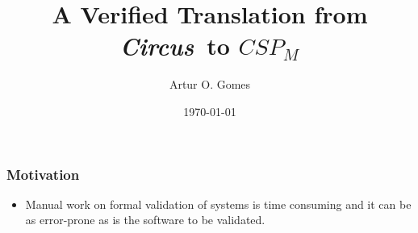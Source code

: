 \documentclass{beamer}
\newcommand{\CSPM}{$CSP_M$}
\def\Circus{{\sf\slshape{Circus}}}
\begin{document}
\title{A Verified Translation from \Circus\ to \CSPM}

\author{Artur O. Gomes}

\date{\today} %

\begin{frame}
\titlepage
\end{frame}


\begin{frame}
\frametitle{Motivation}
\begin{itemize}
  \item Manual work on formal validation of systems is time consuming 
  and it can be as error-prone as is the software to be validated.
\end{itemize}

\end{frame}
\end{document}
